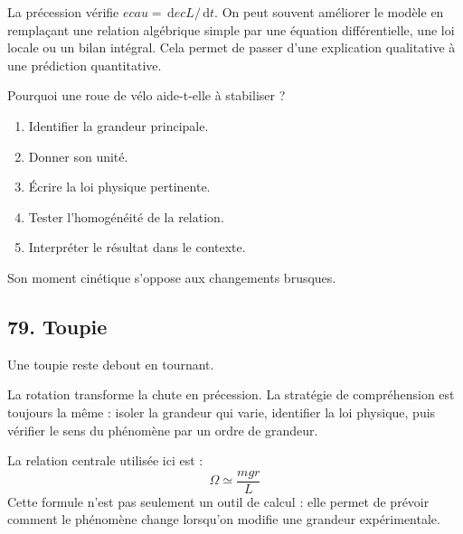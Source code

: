 \documentclass[11pt,a4paper]{article}
\newcommand{\dd}{\,\mathrm d}
\begin{document}
\begin{approfondissementbox}
La précession vérifie $
ec 	au=\dd
ec L/\dd t$.
On peut souvent améliorer le modèle en remplaçant une relation algébrique simple par une équation différentielle, une loi locale ou un bilan intégral. Cela permet de passer d'une explication qualitative à une prédiction quantitative.
\end{approfondissementbox}

\begin{exercicebox}
Pourquoi une roue de vélo aide-t-elle à stabiliser ?
\begin{enumerate}
  \item Identifier la grandeur principale.
  \item Donner son unité.
  \item Écrire la loi physique pertinente.
  \item Tester l'homogénéité de la relation.
  \item Interpréter le résultat dans le contexte.
\end{enumerate}
\end{exercicebox}

\begin{corrigebox}[Indication]
Son moment cinétique s'oppose aux changements brusques.
\end{corrigebox}


\subsection{79. Toupie}

\begin{exemplebox}
Une toupie reste debout en tournant.
\end{exemplebox}

\begin{methodebox}
La rotation transforme la chute en précession.
La stratégie de compréhension est toujours la même : isoler la grandeur qui varie, identifier la loi physique, puis vérifier le sens du phénomène par un ordre de grandeur.
\end{methodebox}

\begin{theorembox}
La relation centrale utilisée ici est :
\[
\Omega\simeq\frac{mgr}{L}
\]
Cette formule n'est pas seulement un outil de calcul : elle permet de prévoir comment le phénomène change lorsqu'on modifie une grandeur expérimentale.
\end{theorembox}
\end{document}
